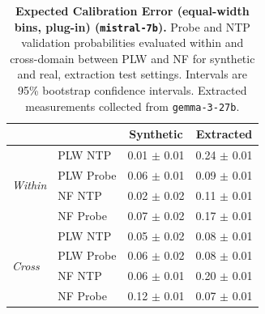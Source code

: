 \begin{table}[ht]
\centering
\begin{tabular}{ll cc}
\toprule
& & Synthetic & Extracted \\
\midrule
\multirow{4}{*}{\textit{Within}}
& PLW NTP & 0.01 $\pm$ 0.01 & 0.24 $\pm$ 0.01 \\
& PLW Probe & 0.06 $\pm$ 0.01 & 0.09 $\pm$ 0.01 \\
& NF NTP & 0.02 $\pm$ 0.02 & 0.11 $\pm$ 0.01 \\
& NF Probe & 0.07 $\pm$ 0.02 & 0.17 $\pm$ 0.01 \\
\midrule
\multirow{4}{*}{\textit{Cross}}
& PLW NTP & 0.05 $\pm$ 0.02 & 0.08 $\pm$ 0.01 \\
& PLW Probe & 0.06 $\pm$ 0.02 & 0.08 $\pm$ 0.01 \\
& NF NTP & 0.06 $\pm$ 0.01 & 0.20 $\pm$ 0.01 \\
& NF Probe & 0.12 $\pm$ 0.01 & 0.07 $\pm$ 0.01 \\
\bottomrule
\end{tabular}
\caption{\textbf{Expected Calibration Error (equal-width bins, plug-in) (\texttt{mistral-7b}).} Probe and NTP validation probabilities evaluated within and cross-domain between PLW and NF for synthetic and real, extraction test settings. Intervals are 95\% bootstrap confidence intervals. Extracted measurements collected from \texttt{gemma-3-27b}.}
\label{tab:mistral-7b-gemma-3-27b-pond_nfix-ece}
\end{table}
